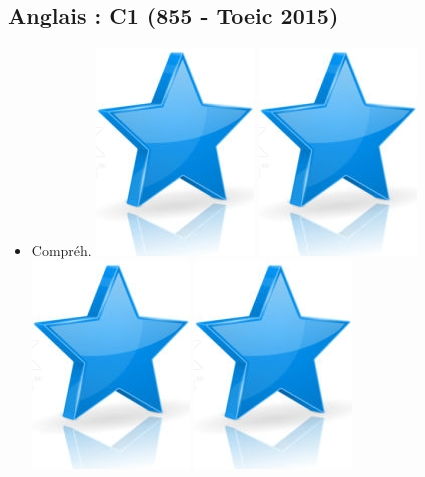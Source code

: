\documentclass[10pt,a4paper,sans]{article}
\begin{document}
\begin{minipage}[t]{0.26\textwidth}
\begin{mdframed}[style=cadreCompetences]
        \subsection{Anglais : C1 \newline (855 - Toeic 2015)}
            \begin{itemize}
                \item{Compréh.
                    \hfill
                    \includegraphics[scale=0.20]{img/star.png} \hspace{-0.2cm}
                    \includegraphics[scale=0.20]{img/star.png} \hspace{-0.2cm}
                    \includegraphics[scale=0.20]{img/star.png} \hspace{-0.2cm}
                    \includegraphics[scale=0.20]{img/star.png} \hspace{-0.2cm}
}
\end{itemize}
\end{mdframed}
\end{minipage}
\end{document}
